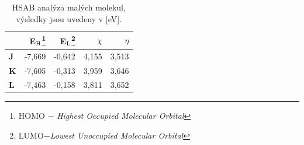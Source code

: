 \documentclass[
digital, %
table,   %
lof,     %
lot,     %
oneside,
]{fithesis3}
\begin{document}
\begin{table}[htbp]\begin{minipage}{\textwidth}
\begin{center}\caption{HSAB analýza malých molekul, výsledky jsou uvedeny v [eV].}
\begin{tabular}{|l|r|r|r|r|}
\hline
\label{hsab_small_porovnani}& E$_{\ce{H}}$\footnote{HOMO $-$ \textit{Highest Occupied Molecular Orbital}}  & E$_{\ce{L}}$\footnote{LUMO$ - $\textit{Lowest Unoccupied Molecular Orbital}} & $\chi$  & $\eta$  \\ \hline
\textbf{J} & -7,669 & -0,642 & 4,155 & 3,513 \\ \hline
\textbf{K} & -7,605 & -0,313 & 3,959 & 3,646 \\ \hline
\textbf{L} & -7,463 & -0,158 & 3,811 & 3,652 \\ \hline
\end{tabular}
\end{center}\end{minipage}
\end{table}
\end{document}
